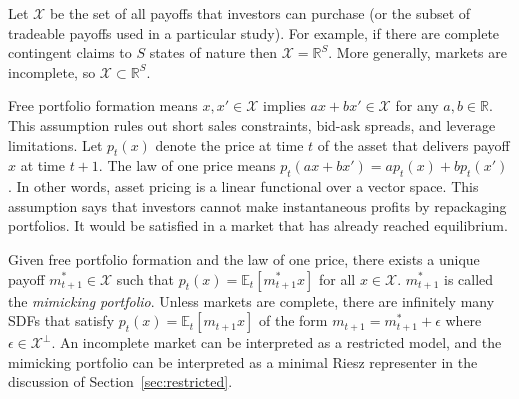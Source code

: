 \begin{enumerate}
    Let $\mathcal{X}$ be the set of all payoffs that investors can purchase (or the subset of tradeable payoffs used in a particular study). For example, if there are complete contingent claims to $S$ states of nature then $\mathcal{X}=\mathbb{R}^S$. More generally, markets are incomplete, so $\mathcal{X}\subset \mathbb{R}^S$. 
    
    Free portfolio formation means $x,x'\in\mathcal{X}$ implies $ax+bx'\in\mathcal{X}$ for any $a,b\in\mathbb{R}$. This assumption rules out short sales constraints, bid-ask spreads, and leverage limitations. Let $p_t(x)$ denote the price at time $t$ of the asset that delivers payoff $x$ at time $t+1$. The law of one price means $p_t(ax+bx')=ap_t(x)+bp_t(x')$. In other words, asset pricing is a linear functional over a vector space. This assumption says that investors cannot make instantaneous profits by repackaging portfolios. It would be satisfied in a market that has already reached equilibrium. 
        
Given free portfolio formation and the law of one price, there exists a unique payoff $m_{t+1}^*\in\mathcal{X}$ such that $p_t(x)=\mathbb{E}_t[m_{t+1}^* x]$ for all $x\in\mathcal{X}$. $m_{t+1}^*$ is called the \textit{mimicking portfolio}. Unless markets are complete, there are infinitely many SDFs that satisfy $p_t(x)=\mathbb{E}_t[m_{t+1} x]$ of the form $m_{t+1}=m_{t+1}^*+\epsilon$ where $\epsilon\in \mathcal{X}^{\perp}$. An incomplete market can be interpreted as a restricted model, and the mimicking portfolio can be interpreted as a minimal Riesz representer in the discussion of Section~\ref{sec:restricted}.
    
\end{enumerate}

